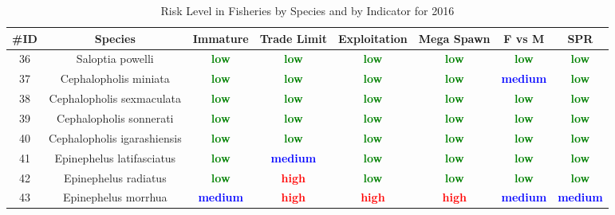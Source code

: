\documentclass{report}\usepackage[]{graphicx}\usepackage[]{color}
\begin{document}
\begin{table}[ht]
\centering
\caption{Risk Level in Fisheries by Species and by Indicator for 2016} 
{\small
\begin{tabular}{cccccccc}
  \hline
\#ID & Species & Immature & Trade Limit & Exploitation & Mega Spawn & F vs M & SPR \\ 
  \hline
 36 & Saloptia powelli & \textcolor{green}{\textbf{low}} & \textcolor{green}{\textbf{low}} & \textcolor{green}{\textbf{low}} & \textcolor{green}{\textbf{low}} & \textcolor{green}{\textbf{low}} & \textcolor{green}{\textbf{low}} \\ 
   37 & Cephalopholis miniata & \textcolor{green}{\textbf{low}} & \textcolor{green}{\textbf{low}} & \textcolor{green}{\textbf{low}} & \textcolor{green}{\textbf{low}} & \textcolor{blue}{\textbf{medium}} & \textcolor{green}{\textbf{low}} \\ 
   38 & Cephalopholis sexmaculata & \textcolor{green}{\textbf{low}} & \textcolor{green}{\textbf{low}} & \textcolor{green}{\textbf{low}} & \textcolor{green}{\textbf{low}} & \textcolor{green}{\textbf{low}} & \textcolor{green}{\textbf{low}} \\ 
   39 & Cephalopholis sonnerati & \textcolor{green}{\textbf{low}} & \textcolor{green}{\textbf{low}} & \textcolor{green}{\textbf{low}} & \textcolor{green}{\textbf{low}} & \textcolor{green}{\textbf{low}} & \textcolor{green}{\textbf{low}} \\ 
   40 & Cephalopholis igarashiensis & \textcolor{green}{\textbf{low}} & \textcolor{green}{\textbf{low}} & \textcolor{green}{\textbf{low}} & \textcolor{green}{\textbf{low}} & \textcolor{green}{\textbf{low}} & \textcolor{green}{\textbf{low}} \\ 
   41 & Epinephelus latifasciatus & \textcolor{green}{\textbf{low}} & \textcolor{blue}{\textbf{medium}} & \textcolor{green}{\textbf{low}} & \textcolor{green}{\textbf{low}} & \textcolor{green}{\textbf{low}} & \textcolor{green}{\textbf{low}} \\ 
   42 & Epinephelus radiatus & \textcolor{green}{\textbf{low}} & \textcolor{red}{\textbf{high}} & \textcolor{green}{\textbf{low}} & \textcolor{green}{\textbf{low}} & \textcolor{green}{\textbf{low}} & \textcolor{green}{\textbf{low}} \\ 
   43 & Epinephelus morrhua & \textcolor{blue}{\textbf{medium}} & \textcolor{red}{\textbf{high}} & \textcolor{red}{\textbf{high}} & \textcolor{red}{\textbf{high}} & \textcolor{blue}{\textbf{medium}} & \textcolor{blue}{\textbf{medium}} \\ 

\end{tabular}}
\end{table}
\end{document}

